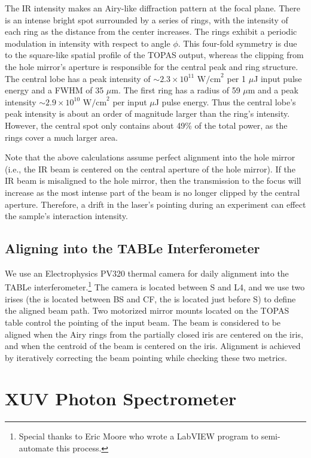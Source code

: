 The IR intensity makes an Airy-like diffraction pattern at the focal plane. There is an intense bright spot surrounded by a series of rings, with the intensity of each ring as the distance from the center increases. The rings exhibit a periodic modulation in intensity with respect to angle $\phi$. This four-fold symmetry is due to the square-like spatial profile of the TOPAS output, whereas the clipping from the hole mirror's aperture is responsible for the central peak and ring structure. The central lobe has a peak intensity of $\sim 2.3 \times 10^{11} \text{ W/cm}^2$ per 1 $\mu$J input pulse energy and a FWHM of 35 $\mu$m. The first ring has a radius of 59 $\mu$m and a peak intensity $\sim 2.9 \times 10^{10} \text{ W/cm}^2$ per input $\mu$J pulse energy. Thus the central lobe's peak intensity is about an order of magnitude larger than the ring's intensity. However, the central spot only contains about 49\% of the total power, as the rings cover a much larger area.

Note that the above calculations assume perfect alignment into the hole mirror (i.e., the IR beam is centered on the central aperture of the hole mirror). If the IR beam is misaligned to the hole mirror, then the transmission to the focus will increase as the most intense part of the beam is no longer clipped by the central aperture. Therefore, a drift in the laser's pointing during an experiment can effect the sample's interaction intensity.

\subsection{Aligning into the TABLe Interferometer}

We use an Electrophysics PV320 thermal camera for daily alignment into the TABLe interferometer.\footnote{Special thanks to Eric Moore who wrote a LabVIEW program to semi-automate this process.} The camera is located between S and L4, and we use two irises (the  is located between BS and CF, the  is located just before S) to define the aligned beam path. Two motorized mirror mounts located on the TOPAS table control the pointing of the input beam. The beam is considered to be aligned when the Airy rings from the partially closed  iris are centered on the  iris, and when the centroid of the beam is centered on the  iris. Alignment is achieved by iteratively correcting the beam pointing while checking these two metrics.

\section{XUV Photon Spectrometer}
\label{sec:XUV_spectrometer}

